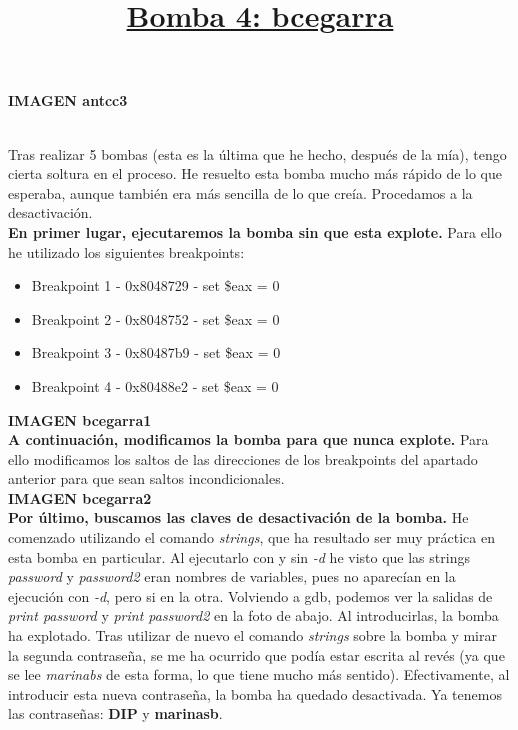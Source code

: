 \documentclass[11pt,a4paper]{article}
\begin{document}
\textbf{IMAGEN antcc3} \\

\title{\large{\textbf{\underline{Bomba 4: bcegarra}}}} \\

Tras realizar 5 bombas (esta es la última que he hecho, después de la mía), tengo cierta soltura en el proceso. He resuelto esta bomba mucho más rápido de lo que esperaba, aunque también era más sencilla de lo que creía. Procedamos a la desactivación. \\

\textbf{En primer lugar, ejecutaremos la bomba sin que esta explote.} Para ello he utilizado los siguientes breakpoints:

\begin{itemize}
	\item Breakpoint 1 - 0x8048729 - set \$eax = 0
	\item Breakpoint 2 - 0x8048752 - set \$eax = 0
	\item Breakpoint 3 - 0x80487b9 - set \$eax = 0
	\item Breakpoint 4 - 0x80488e2 - set \$eax = 0
\end{itemize}

\textbf{IMAGEN bcegarra1} \\

\textbf{A continuación, modificamos la bomba para que nunca explote.} Para ello modificamos los saltos de las direcciones de los breakpoints del apartado anterior para que sean saltos incondicionales. \\

\textbf{IMAGEN bcegarra2} \\

\textbf{Por último, buscamos las claves de desactivación de la bomba.} He comenzado utilizando el comando \emph{strings}, que ha resultado ser muy práctica en esta bomba en particular. Al ejecutarlo con y sin \emph{-d} he visto que las strings \emph{password} y \emph{password2} eran nombres de variables, pues no aparecían en la ejecución con \emph{-d}, pero si en la otra.
Volviendo a gdb, podemos ver la salidas de \emph{print password} y \emph{print password2} en la foto de abajo. Al introducirlas, la bomba ha explotado. Tras utilizar de nuevo el comando \emph{strings} sobre la bomba y mirar la segunda contraseña, se me ha ocurrido que podía estar escrita al revés (ya que se lee \emph{marinabs} de esta forma, lo que tiene mucho más sentido). Efectivamente, al introducir esta nueva contraseña, la bomba ha quedado desactivada.
 Ya tenemos las contraseñas: \textbf{DIP} y \textbf{marinasb}. \\
\end{document}
